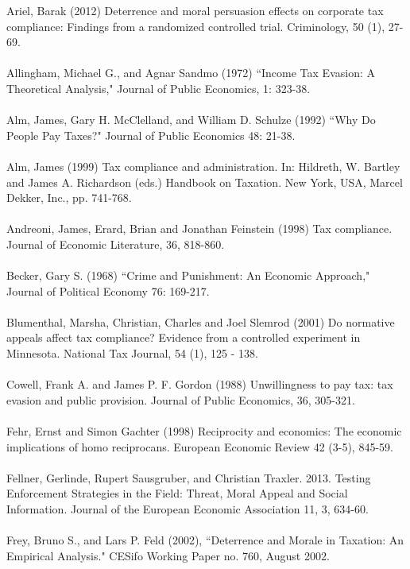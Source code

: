 \documentclass[12pt,titlepage]{article}
\begin{document}
Ariel, Barak (2012) Deterrence and moral persuasion effects on corporate tax compliance: Findings from a
randomized controlled trial. Criminology, 50 (1), 27-69. \\
\\
Allingham, Michael G., and Agnar Sandmo (1972) ``Income Tax Evasion: A Theoretical
Analysis," Journal of Public Economics, 1: 323-38. \\
\\
Alm, James, Gary H. McClelland, and William D. Schulze (1992) ``Why Do People
Pay Taxes?" Journal of Public Economics 48: 21-38. \\
\\
Alm, James (1999) Tax compliance and administration. In: Hildreth, W. Bartley and James A. Richardson
(eds.) Handbook on Taxation. New York, USA, Marcel Dekker, Inc., pp. 741-768. \\
\\
Andreoni, James, Erard, Brian and Jonathan Feinstein (1998) Tax compliance. Journal of Economic
Literature, 36, 818-860. \\
\\
Becker, Gary S. (1968) ``Crime and Punishment: An Economic Approach,"
Journal of Political Economy 76: 169-217.\\
\\
Blumenthal, Marsha, Christian, Charles and Joel Slemrod (2001) Do normative appeals affect tax
compliance? Evidence from a controlled experiment in Minnesota. National Tax Journal, 54 (1),
125 - 138. \\
\\
Cowell, Frank A. and James P. F. Gordon (1988) Unwillingness to pay tax: tax evasion and public provision.
Journal of Public Economics, 36, 305-321.\\
\\
Fehr, Ernst and Simon Gachter (1998) Reciprocity and economics: The economic implications of homo
reciprocans. European Economic Review 42 (3-5), 845-59. \\
\\
Fellner, Gerlinde, Rupert Sausgruber, and Christian Traxler. 2013. Testing Enforcement Strategies in the Field: Threat, Moral Appeal and Social Information. 
Journal of the European Economic Association 11, 3, 634-60.\\
\\
Frey, Bruno S., and Lars P. Feld (2002),  ``Deterrence and Morale in Taxation: An
Empirical Analysis." CESifo Working Paper no. 760, August 2002. \\
\end{document}
